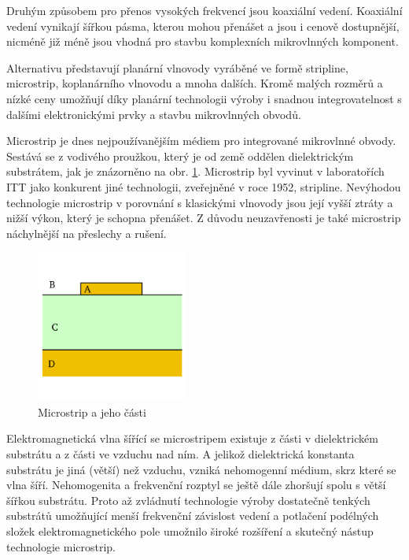 \documentclass[12pt,a4paper,oneside]{article}
\numberwithin{equation}{section} %
\numberwithin{figure}{section} %
\numberwithin{table}{section} %
\renewcommand{\vec}[1]{\mbox{\boldmath$#1$}} %
\begin{document}
Druhým způsobem pro přenos vysokých frekvencí jsou koaxiální vedení. Koaxiální vedení vynikají šířkou pásma, kterou mohou přenášet a jsou i cenově dostupnější, nicméně již méně jsou vhodná pro stavbu komplexních mikrovlnných komponent.

Alternativu představují planární vlnovody vyráběné ve formě stripline, microstrip, koplanárního vlnovodu a mnoha dalších. Kromě malých rozměrů a nízké ceny umožňují díky planární technologii výroby i snadnou integrovatelnost s dalšími elektronickými prvky a stavbu mikrovlnných obvodů.

Microstrip je dnes nejpoužívanějším médiem pro integrované mikrovlnné obvody. Sestává se z vodivého proužkou, který je od země oddělen dielektrickým substrátem, jak je znázorněno na obr. \ref{microstrip}. Microstrip byl vyvinut v laboratořích ITT jako konkurent jiné technologii, zveřejněné v roce 1952, stripline. Nevýhodou technologie microstrip v porovnání s klasickými vlnovody jsou její vyšší ztráty a nižší výkon, který je schopna přenášet. Z důvodu neuzavřenosti je také microstrip náchylnější na přeslechy a rušení.

\begin{figure}[h] 
\begin{center}
\includegraphics[width=5cm]{microstrip.png}
\caption{Microstrip a jeho části}
\label{microstrip}
\end{center}
\end{figure}

Elektromagnetická vlna šířící se microstripem existuje z části v dielektrickém substrátu a z části ve vzduchu nad ním. A jelikož dielektrická konstanta substrátu je jiná (větší) než vzduchu, vzniká nehomogenní médium, skrz které se vlna šíří. Nehomogenita a frekvenční rozptyl se ještě dále zhoršují spolu s větší šířkou substrátu. Proto až zvládnutí technologie výroby dostatečně tenkých substrátů umožňující menší frekvenční závislost vedení a potlačení podélných složek elektromagnetického pole umožnilo široké rozšíření a skutečný nástup technologie microstrip.
\end{document}
